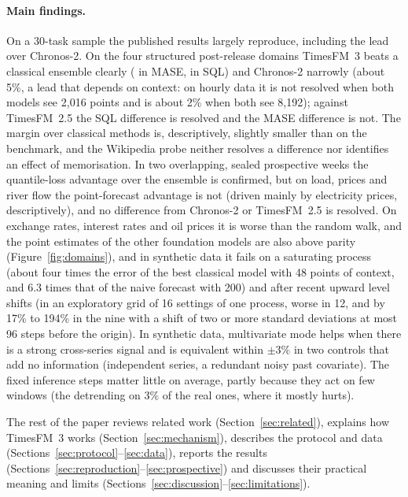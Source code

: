 \paragraph{Main findings.} On a 30-task sample the published results largely reproduce, including the lead over Chronos-2. On the four structured post-release domains TimesFM~3 beats a classical ensemble
clearly (\PoneMase{} in MASE, \PoneSql{} in SQL) and Chronos-2 narrowly (about 5\%, a lead that depends on context: on hourly data it is not resolved when both models
see 2{,}016 points and is about 2\% when both see 8{,}192); against TimesFM~2.5 the SQL difference is
resolved and the MASE difference is not. The margin over classical methods is, descriptively, slightly smaller than on the benchmark, and the Wikipedia
probe neither resolves a difference nor identifies an effect of memorisation. In two overlapping, sealed prospective weeks the
quantile-loss advantage over the ensemble is confirmed, but on load, prices and river flow the point-forecast advantage is not
(driven mainly by electricity prices, descriptively), and no difference from Chronos-2 or TimesFM~2.5 is resolved. On exchange rates, interest rates and oil prices it is worse than the random walk, and the point estimates of the other foundation models are also above parity (Figure~\ref{fig:domains}), and in
synthetic data it fails on a saturating process (about four times the error of the best classical model with 48 points of context, and 6.3
times that of the naive forecast with 200) and after recent upward
level shifts (in an exploratory grid of 16 settings of one process, worse in 12, and by 17\% to 194\% in the nine with a shift of two
or more standard deviations at most 96 steps before the origin). In synthetic data,
multivariate mode helps when there is a strong cross-series signal and is equivalent within $\pm$3\% in two controls that add no information (independent series, a redundant noisy past covariate). The fixed inference steps matter little on
average, partly because they act on few windows (the detrending on 3\% of the real ones, where it mostly hurts).

The rest of the paper reviews related work (Section~\ref{sec:related}), explains how TimesFM~3 works (Section~\ref{sec:mechanism}),
describes the protocol and data (Sections~\ref{sec:protocol}--\ref{sec:data}), reports the results
(Sections~\ref{sec:reproduction}--\ref{sec:prospective}) and discusses their practical meaning and limits
(Sections~\ref{sec:discussion}--\ref{sec:limitations}).
